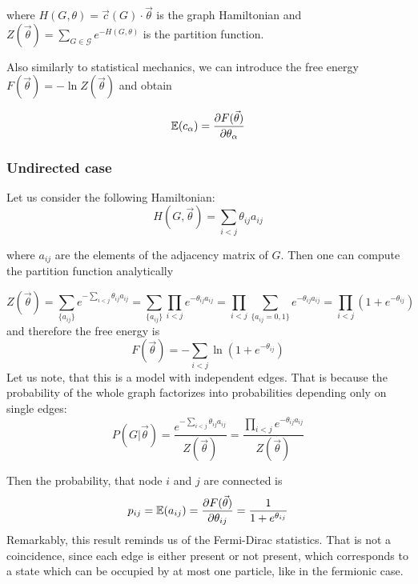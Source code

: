 where $H(G,\theta) = \vec{c}(G)\cdot\vec{\theta}$ is the graph Hamiltonian and $Z(\vec{\theta}) = \sum_{G \in \mathcal{G}}e^{-H(G,\theta)}$ is the partition function.

Also similarly to statistical mechanics, we can introduce the free energy $F(\vec{\theta}) = -\ln Z(\vec{\theta})$ and obtain

\begin{equation}
    \mathbb{E}(c_\alpha) = \frac{\partial F(\vec{\theta})}{\partial \theta_\alpha}
\end{equation}

\subsubsection{Undirected case}
Let us consider the following Hamiltonian:
\begin{equation}
    H(G,\vec{\theta}) = \sum_{i<j} \theta_{ij}a_{ij}
\end{equation}

where $a_{ij}$ are the elements of the adjacency matrix of $G$. Then one can compute the partition function analytically

\begin{equation}
    Z(\vec{\theta}) = \sum_{\{a_{ij}\}} e^{-\sum_{i<j} \theta_{ij}a_{ij}} =  \sum_{\{a_{ij}\}}\prod_{i<j}e^{-\theta_{ij}a_{ij}} = \prod_{i<j} \sum_{\{a_{ij} = 0,1\}}e^{-\theta_{ij}a_{ij}} = \prod_{i<j}(1 + e^{-\theta_{ij}})
\end{equation}
and therefore the free energy is
\begin{equation}
    F(\vec{\theta}) = -\sum_{i<j}\ln(1 + e^{-\theta_{ij}})
\end{equation}
Let us note, that this is a model with independent edges. That is because the probability of the whole graph factorizes into probabilities depending only on single edges:
\begin{equation}
    P(G|\vec{\theta}) = \frac{e^{-\sum_{i<j} \theta_{ij}a_{ij}}}{Z(\vec{\theta})} = \frac{\prod_{i<j}e^{-\theta_{ij}a_{ij}}}{{Z(\vec{\theta})}}
\end{equation}

Then the probability, that node $i$ and $j$ are connected is
\begin{equation}
    p_{ij} = \mathbb{E}(a_{ij}) = \frac{\partial F(\vec{\theta})}{\partial \theta_{ij}} = \frac{1}{1 + e^{\theta_{ij}}}
\end{equation}
Remarkably, this result reminds us of the Fermi-Dirac statistics. That is not a coincidence, since each edge is either present or not present, which corresponds to a state which can be occupied by at most one particle, like in the fermionic case.

